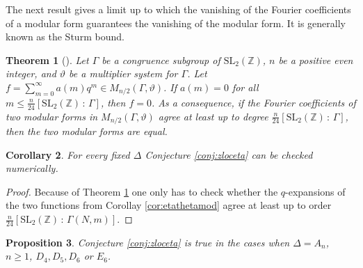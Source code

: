 \documentclass{article}
\newtheorem{theorem}{Theorem}%
\newtheorem{proposition}[theorem]{Proposition}
\newtheorem{corollary}[theorem]{Corollary}
\theoremstyle{definition}
\newcommand{\ZZ} {{\mathbb Z}}		%
\begin{document}
The next result gives a limit up to which the vanishing of the Fourier coefficients of a modular form guarantees the vanishing of the modular form. It is generally known as the Sturm bound. %
\begin{theorem}[{\cite[Theorem 1]{sturm1987congruence}}]
	\label{thm:sturmbound}
	Let $\Gamma$ be a congruence subgroup of $\mathrm{SL}_2(\ZZ)$, $n$ be a positive even integer, and $\vartheta$ be a multiplier system for $\Gamma$. Let $f=\sum_{m=0}^{\infty} a(m)q^m \in M_{n/2}(\Gamma,\vartheta)$. If $a(m)=0$ for all $m \leq \frac{n}{24} [\mathrm{SL}_2(\ZZ) \, : \, \Gamma ]$, then $f=0$. As a consequence, if the Fourier coefficients of two modular forms in $M_{n/2}(\Gamma,\vartheta)$ agree at least up to degree $\frac{n}{24} [\mathrm{SL}_2(\ZZ) \, : \, \Gamma ]$, then the two modular forms are equal.
\end{theorem}
\begin{corollary}
	For every fixed $\Delta$ Conjecture \ref{conj:zloceta} can be checked numerically.
\end{corollary}
\begin{proof}
	Because of Theorem \ref{thm:sturmbound}
	one only has to check whether the $q$-expansions of the two functions from Corollay \ref{cor:etathetamod} agree at least up to order $\frac{n}{24} [\mathrm{SL}_2(\ZZ) \, : \, \Gamma(N,m) ]$.
\end{proof}


\begin{proposition}
	\label{prop:zlocetacheck}
	Conjecture \ref{conj:zloceta} is true in the cases when $\Delta=A_n$, $n\geq 1$, $D_4, D_5, D_6$ or $E_6$.
\end{proposition}
\end{document}

